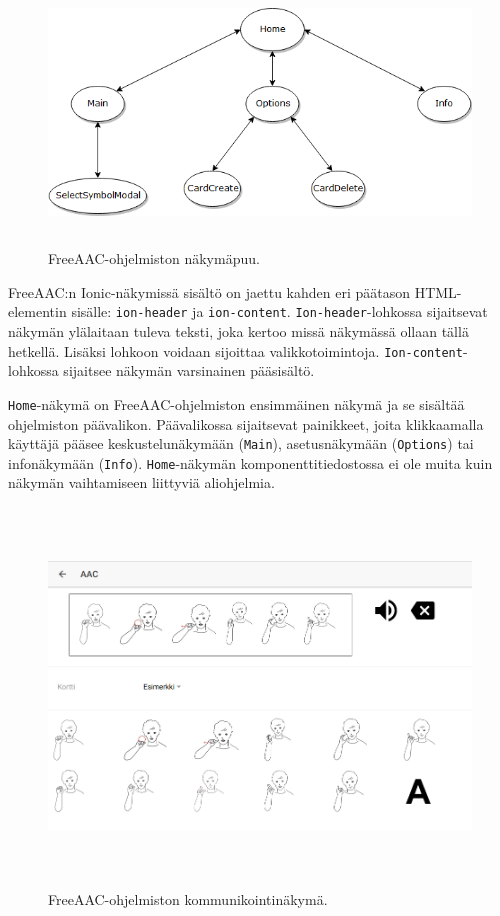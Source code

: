 \documentclass[utf8]{gradu3}
\begin{document}
\begin{figure}[h]\centering
  \includegraphics[height=7cm,keepaspectratio]{FreeAACViews}
  \caption[FreeAAC-sovelluksen näkymäpuu.]
  {FreeAAC-ohjelmiston näkymäpuu.}
  \label{fig:FreeAACViews}
\end{figure}

FreeAAC:n Ionic-näkymissä sisältö on jaettu kahden eri päätason HTML-elementin sisälle: \texttt{ion-header} ja \texttt{ion-content}. \texttt{Ion-header}-lohkossa sijaitsevat näkymän ylälaitaan tuleva teksti, joka kertoo missä näkymässä ollaan tällä hetkellä. Lisäksi lohkoon voidaan sijoittaa valikkotoimintoja. \texttt{Ion-content}-lohkossa sijaitsee näkymän varsinainen pääsisältö.

\texttt{Home}-näkymä on FreeAAC-ohjelmiston ensimmäinen näkymä ja se sisältää ohjelmiston päävalikon. Päävalikossa sijaitsevat painikkeet, joita klikkaamalla käyttäjä pääsee keskustelunäkymään (\texttt{Main}), asetusnäkymään (\texttt{Options}) tai infonäkymään (\texttt{Info}). \texttt{Home}-näkymän komponenttitiedostossa ei ole muita kuin näkymän vaihtamiseen liittyviä aliohjelmia.

\begin{figure}[h]\centering
  \includegraphics[height=10cm,keepaspectratio]{main-view-layout}
  \caption[FreeAAC-ohjelmiston kommunikointinäkymä.]
  {FreeAAC-ohjelmiston kommunikointinäkymä.}
  \label{fig:main-view-layout}
\end{figure}
\end{document}
